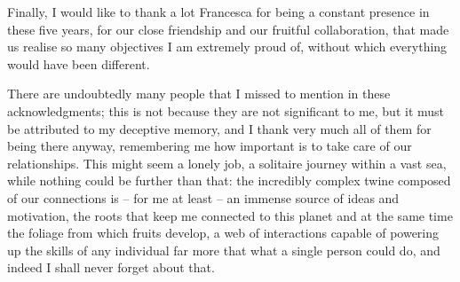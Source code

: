 Finally, I would like to thank a lot Francesca for being a constant presence in these five years, for our close friendship and our fruitful collaboration, that made us realise so many objectives I am extremely proud of, without which everything would have been different.

There are undoubtedly many people that I missed to mention in these acknowledgments; this is not because they are not significant to me, but it must be attributed to my deceptive memory, and I thank very much all of them for being there anyway, remembering me how important is to take care of our relationships. This might seem a lonely job, a solitaire journey within a vast sea, while nothing could be further than that: the incredibly complex twine composed of our connections is -- for me at least -- an immense source of ideas and motivation, the roots that keep me connected to this planet and at the same time the foliage from which fruits develop, a web of interactions capable of powering up the skills of any individual far more that what a single person could do, and indeed I shall never forget about that.